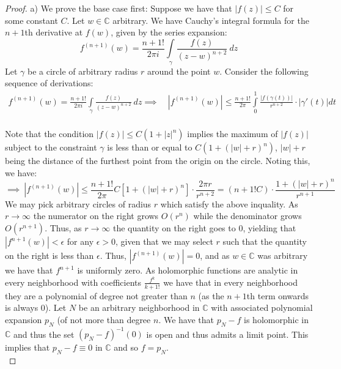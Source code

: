 \documentclass{article}
\newcommand{\bb}[1]{\mathbb{#1}}
\begin{document}
\begin{proof}
  a) We prove the base case first: Suppose we have that $|f(z)| \leq C$ for some constant $C$. Let $w \in \bb{C}$ arbitrary. We have Cauchy's integral formula for the $n+1$th derivative at $f(w)$, given by the series expansion:
  \[
    f^{(n+1)}(w) = \frac{n+1!}{2\pi i} \int\limits_{\gamma} \frac{f(z)}{(z-w)^{n+2}} \ dz
  \]
  Let $\gamma$ be a circle of arbitrary radius $r$ around the point $w$. Consider the following sequence of derivations:
  \begin{align*}
    f^{(n+1)}(w) = \frac{n+1!}{2\pi i} \int\limits_{\gamma} \frac{f(z)}{(z-w)^{n+2}} \ dz \implies  \ & |f^{(n+1)}(w)| \leq  \frac{n+1!}{2\pi } \int\limits_{0}^{1} \frac{|f(\gamma(t))|}{r^{n+2}} \cdot |\gamma'(t)| dt \\ 
  \end{align*}

  Note that the condition $|f(z)| \leq C(1 + |z|^{n})$ implies the maximum of $|f(z)|$ subject to the constraint $\gamma$ is less than or equal to $C(1 + (|w|+r)^{n})$, $|w| + r$ being the distance of the furthest point from the origin on the circle. Noting this, we have:
  \[
    \implies \ |f^{(n+1)}(w)| \leq \frac{n+1!}{2 \pi} C[1 + (|w|+r)^{n}] \cdot \frac{2\pi r}{r^{n+2}} = (n+1! C) \cdot \frac{1 + (|w| + r)^{n}}{r^{n+1}}
  \]
  We may pick arbitrary circles of radius $r$ which satisfy the above inquality. As $r \to \infty$ the numerator on the right grows $O(r^{n})$ while the denominator grows $O(r^{n+1})$. Thus, as $r \to \infty$ the quantity on the right goes to $0$, yielding that $|f^{n+1}(w)| < \epsilon$ for any $\epsilon > 0$, given that we may select $r$ such that the quantity on the right is less than $\epsilon$. Thus, $|f^{(n+1)}(w)| = 0$, and as $w \in \bb{C}$ was arbitrary we have that $f^{n+1}$ is uniformly zero. As holomorphic functions are analytic in every neighborhood with coefficients $\frac{f^{k}}{k+1!}$ we have that in every neighborhood they are a polynomial of degree not greater than $n$ (as the $n+1$th term onwards is always $0$). Let $N$ be an arbitrary neighborhood in $\bb{C}$ with associated polynomial expansion $p_{N}$ (of not more than degree $n$. We have that $p_{N}-f$ is holomorphic in $\bb{C}$ and thus the set $(p_{N}-f)^{-1}(0)$ is open and thus admits a limit point. This implies that $p_{N} - f \equiv 0$ in $\bb{C}$ and so $f = p_{N}$. \\


\end{proof}
\end{document}
